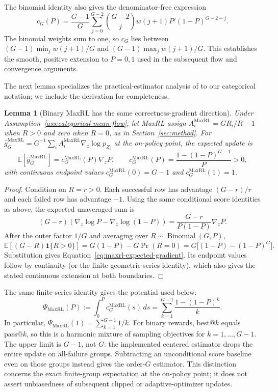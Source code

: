 \documentclass{article}
\newcommand{\1}{\mathbf 1}
\newcommand{\E}{\mathbb E}
\newtheorem{lemma}{Lemma}[section]
\theoremstyle{remark}
\theoremstyle{definition}
\theoremstyle{plain}
\begin{document}
The binomial identity also gives the denominator-free expression
\[
 c_G(P)=\frac{G-1}{G}\sum_{j=0}^{G-2}\binom{G-2}{j}
 w(j+1)P^j(1-P)^{G-2-j}.
\]
The binomial weights sum to one, so $c_G$ lies between
$(G-1)\min_j w(j+1)/G$ and $(G-1)\max_j w(j+1)/G$.
This establishes the smooth, positive extension to $P=0,1$ used in the
subsequent flow and convergence arguments.

The next lemma specializes the practical-estimator analysis of
\citet[Section~4.3 and App.~D, Theorem~5]{tajwar2026maxrl}
to our categorical notation; we include the derivation for completeness.

\begin{lemma}[Binary MaxRL has the same correctness-gradient direction]
\label{lem:maxrl-mean}
Under Assumption~\ref{ass:categorical-mean-flow}, let MaxRL assign
$A_i^{\mathrm{MaxRL}}=GR_i/R-1$ when $R>0$ and zero when $R=0$, as in
Section~\ref{sec:method}. For
$\widehat g_G^{\mathrm{MaxRL}}=G^{-1}\sum_i
 A_i^{\mathrm{MaxRL}}\nabla_z\log p_{Z_i}$ at the on-policy point, the
expected update is
\begin{equation}
  \E[\widehat g_G^{\mathrm{MaxRL}}]
  =c_G^{\mathrm{MaxRL}}(P)\nabla_zP,
  \qquad
  c_G^{\mathrm{MaxRL}}(P)
  =\frac{1-(1-P)^{G-1}}{P}>0,
  \label{eq:maxrl-expected-gradient}
\end{equation}
with continuous endpoint values
$c_G^{\mathrm{MaxRL}}(0)=G-1$ and
$c_G^{\mathrm{MaxRL}}(1)=1$.
\end{lemma}

\begin{proof}
Condition on $R=r>0$. Each successful row has advantage $(G-r)/r$ and each
failed row has advantage $-1$. Using the same conditional score identities as
above, the expected unaveraged sum is
\[
  (G-r)\!\left(\nabla_z\log P-\nabla_z\log(1-P)\right)
  =\frac{G-r}{P(1-P)}\nabla_zP.
\]
After the outer factor $1/G$ and averaging over
$R\sim\operatorname{Binomial}(G,P)$,
\[
 \E[(G-R)\1\{R>0\}]
 =G(1-P)-G\Pr(R=0)
 =G\big[(1-P)-(1-P)^G\big].
\]
Substitution gives Equation~\eqref{eq:maxrl-expected-gradient}. Its endpoint
values follow by continuity (or the finite geometric-series identity), which
also gives the stated continuous extension at both boundaries.
\end{proof}

The same finite-series identity gives the potential used below:
\begin{equation}
 \Psi_{\mathrm{MaxRL}}(P)
 :=\int_0^P c_G^{\mathrm{MaxRL}}(s)\,ds
 =\sum_{k=1}^{G-1}\frac{1-(1-P)^k}{k}.
 \label{eq:maxrl-potential-finite-sum}
\end{equation}
In particular, $\Psi_{\mathrm{MaxRL}}(1)=\sum_{k=1}^{G-1}1/k$.
For binary rewards, best@\(k\) equals pass@\(k\), so this is a harmonic
mixture of sampling objectives for $k=1,\ldots,G-1$. The upper limit is
$G-1$, not $G$: the implemented centered estimator drops the entire update
on all-failure groups. Subtracting an unconditional score baseline even on
those groups instead gives the order-$G$ estimator. This distinction concerns
the exact finite-group expectation at the on-policy point; it does not assert
unbiasedness of subsequent clipped or adaptive-optimizer updates.
\end{document}
